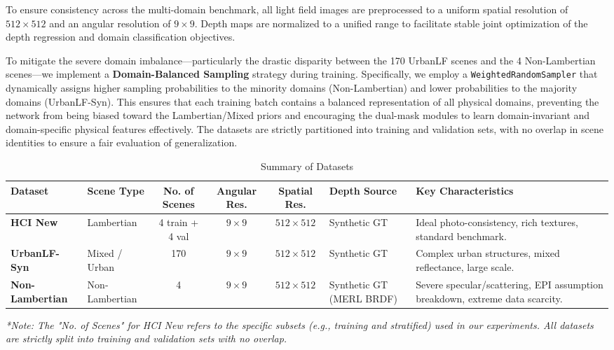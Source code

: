 \documentclass[lettersize,journal]{IEEEtran}
\begin{document}
To ensure consistency across the multi-domain benchmark, all light field images are preprocessed to a uniform spatial resolution of $512 \times 512$ and an angular resolution of $9 \times 9$. Depth maps are normalized to a unified range to facilitate stable joint optimization of the depth regression and domain classification objectives.

To mitigate the severe domain imbalance---particularly the drastic disparity between the 170 UrbanLF scenes and the 4 Non-Lambertian scenes---we implement a \textbf{Domain-Balanced Sampling} strategy during training. Specifically, we employ a \texttt{WeightedRandomSampler} that dynamically assigns higher sampling probabilities to the minority domains (Non-Lambertian) and lower probabilities to the majority domains (UrbanLF-Syn). This ensures that each training batch contains a balanced representation of all physical domains, preventing the network from being biased toward the Lambertian/Mixed priors and encouraging the dual-mask modules to learn domain-invariant and domain-specific physical features effectively. The datasets are strictly partitioned into training and validation sets, with no overlap in scene identities to ensure a fair evaluation of generalization.

\begin{table}[!t]
\caption{Summary of Datasets}
\label{tab:datasets}
\centering
\begin{tabular}{llcccll}
\toprule
\textbf{Dataset} & \textbf{Scene Type} & \textbf{No. of Scenes} & \textbf{Angular Res.} & \textbf{Spatial Res.} & \textbf{Depth Source} & \textbf{Key Characteristics} \\
\midrule
\textbf{HCI New} & Lambertian & 4 train + 4 val & $9 \times 9$ & $512 \times 512$ & Synthetic GT & Ideal photo-consistency, rich textures, standard benchmark. \\
\textbf{UrbanLF-Syn} & Mixed / Urban & 170 & $9 \times 9$ & $512 \times 512$ & Synthetic GT & Complex urban structures, mixed reflectance, large scale. \\
\textbf{Non-Lambertian} & Non-Lambertian & 4 & $9 \times 9$ & $512 \times 512$ & Synthetic GT (MERL BRDF) & Severe specular/scattering, EPI assumption breakdown, extreme data scarcity. \\
\bottomrule
\end{tabular}
\vspace{2mm}

\footnotesize{\textit{*Note: The "No. of Scenes" for HCI New refers to the specific subsets (e.g., training and stratified) used in our experiments. All datasets are strictly split into training and validation sets with no overlap.}}
\end{table}
\end{document}
